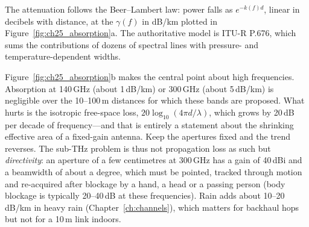 
The attenuation follows the Beer--Lambert law: power falls as $e^{-k(f)d}$, linear in decibels with
distance, at the  $\gamma(f)$ in dB/km plotted in
Figure~\ref{fig:ch25_absorption}a. The authoritative model is ITU-R P.676, which sums the contributions
of dozens of spectral lines with pressure- and temperature-dependent widths.

Figure~\ref{fig:ch25_absorption}b makes the central point about high frequencies. Absorption at
140\,GHz (about 1\,dB/km) or 300\,GHz (about 5\,dB/km) is negligible over the 10--100\,m distances
for which these bands are proposed. What hurts is the isotropic free-space loss, $20\log_{10}(4\pi
d/\lambda)$, which grows by 20\,dB per decade of frequency---and that is entirely a statement about the
shrinking effective area of a fixed-gain antenna. Keep the apertures fixed and the trend reverses.
The sub-THz problem is thus not propagation loss as such but \emph{directivity}: an aperture of a few
centimetres at 300\,GHz has a gain of 40\,dBi and a beamwidth of about a degree, which must be pointed,
tracked through motion and re-acquired after blockage by a hand, a head or a passing person (body
blockage is typically 20--40\,dB at these frequencies). Rain adds about 10--20\,dB/km in heavy rain
(Chapter~\ref{ch:channels}), which matters for backhaul hops but not for a 10\,m link indoors.


